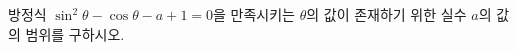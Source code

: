 방정식 $\sin^2\theta-\cos\theta-a+1=0$을 만족시키는 $\theta$의 값이 존재하기 위한 실수 $a$의 값의 범위를 구하시오. \cond{$0\le\theta<2\pi$}

